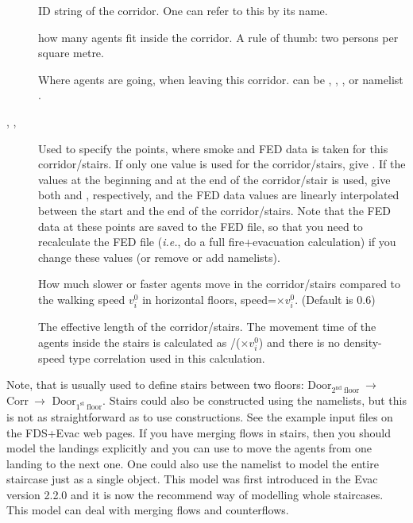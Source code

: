 \documentclass[12pt,a4paper,final,twoside]{stylevk}
\begin{document}
\begin{description}
%
\item[] ID string of the corridor. One can refer to this
   by its name.
%
\item[] how many agents fit inside the
  corridor.  A rule of thumb: two persons per square metre.
%
\item[] Where agents are going, when leaving this
  corridor.  can be , ,
  , or  namelist .
%
\item[, , ] Used to specify the
  points, where smoke and FED data is taken for this corridor/stairs.
  If only one value is used for the corridor/stairs, give .
  If the values at the beginning and at the end of the corridor/stair
  is used, give both  and , respectively, and
  the FED data values are linearly interpolated between the start and
  the end of the corridor/stairs.  Note that the FED data at these
  points are saved to the FED file, so that you need to recalculate
  the FED file (\emph{i.e.}, do a full fire+evacuation calculation) if
  you change these values (or remove or add  namelists).
%
\item[] How much slower or faster agents move in the
  corridor/stairs compared to the walking speed $v_i^0$ in horizontal
  floors, speed=$\times v_i^0$.  (Default is 0.6)
%
\item[] The effective length of the
  corridor/stairs.  The movement time of the agents inside the stairs
  is calculated as /($\times
  v_i^0$) and there is no density-speed type correlation used in this
  calculation. 
%
\end{description}
%
Note, that  is usually used to define stairs between two
floors: $\mathrm{Door_{2^{nd} ~floor}} ~ \rightarrow$ $\mathrm{Corr} ~
\rightarrow$ $\mathrm{Door_{1^{st} ~floor}}$.  Stairs could also be
constructed using the  namelists, but this is not as
straightforward as to use  constructions.  See the example
input files on the FDS+Evac web pages.  If you have merging flows in
stairs, then you should model the landings explicitly and you can use
 to move the agents from one landing to the next one.  One
could also use the  namelist to model the entire staircase
just as a single object.  This model was first introduced in the Evac
version 2.2.0 and it is now the recommend way of modelling whole
staircases.  This model can deal with merging flows and counterflows.
\end{document}
